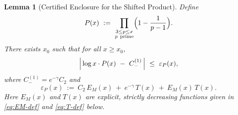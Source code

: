 \documentclass[11pt]{article}
\theoremstyle{inline}
\theoremstyle{break}
\newtheorem{lemma}{Lemma}
\theoremstyle{break}
\theoremstyle{break}
\theoremstyle{break}
\theoremstyle{break}
\theoremstyle{break}
\theoremstyle{break}
\theoremstyle{inline}
\begin{document}
\begin{lemma}[Certified Enclosure for the Shifted Product]\label{lem:shifted-enclosure}
Define
\begin{equation}\label{eq:P-def}
P(x)\ :=\ \prod_{\substack{3\le p\le x\\ p\ \mathrm{prime}}}\Bigl(1-\frac{1}{p-1}\Bigr).
\end{equation}
There exists \(x_0\) such that for all \(x\ge x_0\),
\begin{equation}\label{eq:shifted-enclosure}
\Bigl|\,\log x\cdot P(x)\ -\ C_-^{(1)}\,\Bigr|\ \le\ \varepsilon_P(x),
\end{equation}
where \(C_-^{(1)}=e^{-\gamma}C_2\) and
\begin{equation}\label{eq:epsP-def}
\varepsilon_P(x)\ :=\ C_2\,E_M(x)\ +\ e^{-\gamma}\,T(x)\ +\ E_M(x)\,T(x).
\end{equation}
Here \(E_M(x)\) and \(T(x)\) are explicit, strictly decreasing functions given in
\eqref{eq:EM-def} and \eqref{eq:T-def} below.
\end{lemma}
\end{document}

